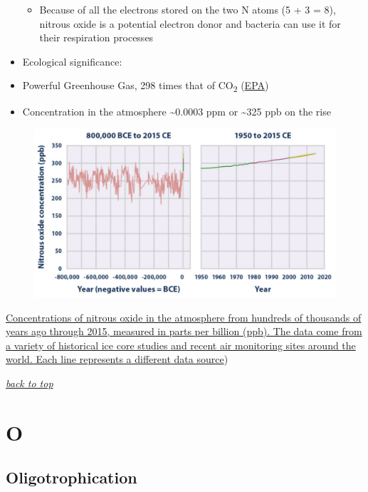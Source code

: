 \documentclass[]{book}
\providecommand{\tightlist}{%
  \setlength{\itemsep}{0pt}\setlength{\parskip}{0pt}}
\theoremstyle{definition}
\theoremstyle{definition}
\theoremstyle{definition}
\theoremstyle{remark}
\begin{document}
\begin{itemize}
  \begin{itemize}
  \tightlist
  \item
    Because of all the electrons stored on the two N atoms (5 + 3 = 8),
    nitrous oxide is a potential electron donor and bacteria can use it
    for their respiration processes
  \end{itemize}
\item
  Ecological significance:
\item
  Powerful Greenhouse Gas, 298 times that of CO\textsubscript{2}
  (\href{https://www.epa.gov/sites/production/files/2015-07/documents/emission-factors_2014.pdf}{EPA})
\item
  Concentration in the atmosphere \textasciitilde{}0.0003 ppm or
  \textasciitilde{}325 ppb on the rise
\end{itemize}

\begin{figure}
\centering
\includegraphics{pictures/N2O_concentrations.png}
\caption{}
\end{figure}

\href{https://www.epa.gov/sites/production/files/2016-08/documents/print_ghg-concentrations-2016.pdf}{Concentrations
of nitrous oxide in the atmosphere from hundreds of thousands of years
ago through 2015, measured in parts per billion (ppb). The data come
from a variety of historical ice core studies and recent air monitoring
sites around the world. Each line represents a different data
source})\citep{Epa2016-yj}

\emph{\protect\hyperlink{top}{back to top}}

\section{O}\label{o}

\subsection{Oligotrophication}\label{oligotrophication}
\end{document}

